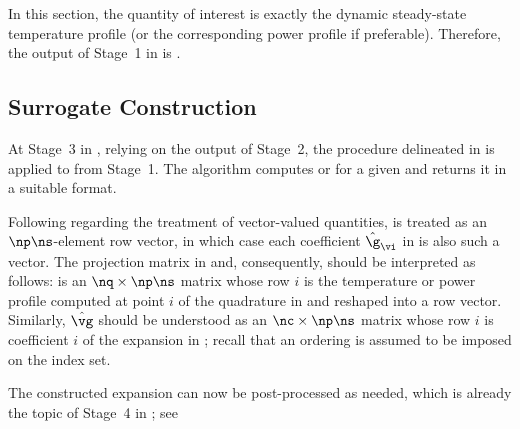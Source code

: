 In this section, the quantity of interest \g is exactly the dynamic steady-state
temperature profile \mq (or the corresponding power profile \mp if preferable).
Therefore, the output of Stage~1 in  is
.

\subsection{Surrogate Construction}

At Stage~3 in , relying on the output of Stage~2, the
procedure delineated in  is applied to
 from Stage~1. The algorithm computes
\mp or \mq for a given \vu and returns it in a suitable format.

Following  regarding the treatment of
vector-valued quantities, \g is treated as an $\np \ns$-element row vector, in
which case each coefficient $\hat{\g}_{\vi}$ in  is also
such a vector. The projection matrix in  and,
consequently,  should be interpreted as follows: \vg is
an $\nq \times \np \ns$ matrix whose row $i$ is the temperature or power profile
computed at point $i$ of the quadrature in  and reshaped
into a row vector. Similarly, $\hat{\vg}$ should be understood as an $\nc \times
\np \ns$ matrix whose row $i$ is coefficient $i$ of the expansion in
; recall that an ordering is assumed to be imposed on the
index set.

The constructed expansion can now be post-processed as needed, which is already
the topic of Stage~4 in ; see 
